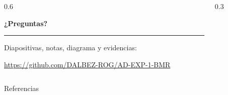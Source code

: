 \documentclass[aspectratio=169,11pt]{beamer}
\newcommand{\quienexpone}{}
\begin{document}
\renewcommand{\quienexpone}{}
\begin{frame}
\vfill
\begin{columns}[c]
\begin{column}{0.6\textwidth}
{\color{verde}\fontsize{30}{34}\selectfont\bfseries ¿Preguntas?\par}
\vspace{10pt}
{\color{verde}\rule{2.4cm}{3pt}\par}
\vspace{12pt}
{\small Diapositivas, notas, diagrama y evidencias:\par}
{\small\url{https://github.com/DALBEZ-ROG/AD-EXP-1-BMR}\par}
\end{column}
\begin{column}{0.3\textwidth}
\centering
{}
\end{column}
\end{columns}
\vfill
\end{frame}

\begin{frame}[allowframebreaks]{Referencias}
\scriptsize
\printbibliography[heading=none]
\end{frame}
\end{document}
